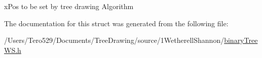 x\+Pos to be set by tree drawing Algorithm 



The documentation for this struct was generated from the following file\+:\begin{DoxyCompactItemize}
\item 
/\+Users/\+Tero529/\+Documents/\+Tree\+Drawing/source/1\+Wetherell\+Shannon/\hyperlink{binary_tree_w_s_8h}{binary\+Tree\+W\+S.\+h}\end{DoxyCompactItemize}
